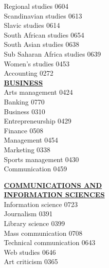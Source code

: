 \documentclass[9pt]{article}
\newcommand{\categoryheading}[1]{{\fontsize{8}{11}\selectfont \textbf{\uline{#1}}}}
\begin{document}
\begin{multicols}{3}
Regional studies \hfill 0604 \leavevmode \\
Scandinavian studies \hfill 0613 \leavevmode \\
Slavic studies \hfill 0614 \leavevmode \\
South African studies \hfill 0654 \leavevmode \\
South Asian studies \hfill 0638 \leavevmode \\
Sub Saharan Africa studies \hfill 0639 \leavevmode \\
Women's studies \hfill 0453 \leavevmode \\
Accounting \hfill 0272 \leavevmode \\
\columnbreak
\categoryheading{BUSINESS} \leavevmode \\
Arts management \hfill 0424 \leavevmode \\
Banking \hfill 0770 \leavevmode \\
Business \hfill 0310 \leavevmode \\
Entrepreneurship \hfill 0429 \leavevmode \\
Finance \hfill 0508 \leavevmode \\
Management \hfill 0454 \leavevmode \\
Marketing \hfill 0338 \leavevmode \\
Sports management \hfill 0430 \leavevmode \\
Communication \hfill 0459

\categoryheading{COMMUNICATIONS AND \leavevmode \\
INFORMATION SCIENCES} \leavevmode \\
Information science \hfill 0723 \leavevmode \\
Journalism \hfill 0391 \leavevmode \\
Library science \hfill 0399 \leavevmode \\
Mass communication \hfill 0708 \leavevmode \\
Technical communication \hfill 0643 \leavevmode \\
Web studies \hfill 0646 \leavevmode \\
Art criticism \hfill 0365


\end{multicols}
\end{document}
